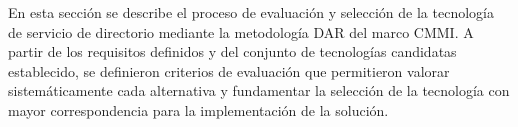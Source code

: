 \label{cap:dar}
\vspace*{0.7cm}

En esta sección se describe el proceso de evaluación y selección de la tecnología de servicio de directorio mediante la metodología \ac{DAR} del marco \ac{CMMI}. A partir de los requisitos definidos y del conjunto de tecnologías candidatas establecido, se definieron criterios de evaluación que permitieron valorar sistemáticamente cada alternativa y fundamentar la selección de la tecnología con mayor correspondencia para la implementación de la solución.






